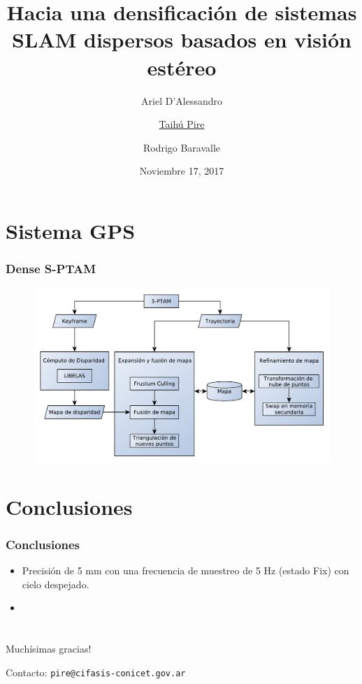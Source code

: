 \documentclass[compress]{beamer}
\title{Hacia una densificación de sistemas SLAM	dispersos basados en visión estéreo}
\author{Ariel D'Alessandro \and \underline{Taihú Pire} \and Rodrigo Baravalle}
\institute{	CIFASIS - CONICET - UNR}
\date{\scriptsize{Noviembre 17, 2017}}
\begin{document}
\frame{\titlepage}


\section{Sistema GPS}

\begin{frame}
	\frametitle{Dense S-PTAM}
	\begin{figure}[htb]
		\centering
		\includegraphics[width=\columnwidth]{images/dense_diagram.pdf}
	\end{figure}
\end{frame}


\section{Conclusiones}

\begin{frame}
	\frametitle{Conclusiones}
	\begin{itemize}
		\item Precisión de 5 mm con una frecuencia de muestreo de 5 Hz (estado Fix) con cielo despejado.
		\item 
	\end{itemize}
\end{frame}


\section*{}

\begin{frame}
	\centering
	\Large{Muchísimas gracias!}
	
	
	\vspace{2cm}
	Contacto: {\tt pire@cifasis-conicet.gov.ar}
\end{frame}



\end{document}
